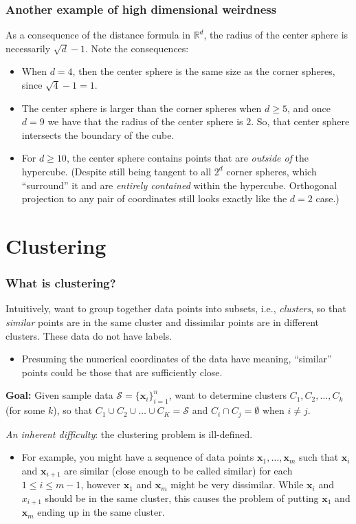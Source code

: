 \documentclass[smaller]{beamer}
\theoremstyle{example}
\newcommand{\x}{\textbf{x}}
\begin{document}
\begin{frame}
    \frametitle{Another example of high dimensional weirdness}
    As a consequence of the distance formula in $\mathbb R^d$, the radius of the center sphere is necessarily $\sqrt{d} - 1$. Note the consequences: 
    \begin{itemize}
        \item When $d=4$, then the center sphere is the same size as the corner spheres, since $\sqrt{4}-1 = 1$.
        \item The center sphere is larger than the corner spheres when $d\ge 5$, and once $d = 9$ we have that the radius of the center sphere is $2$. So, that center sphere intersects the boundary of the cube.
        \item For $d\ge 10$, the center sphere contains points that are \textit{outside of} the hypercube. (Despite still being tangent to all $2^d$ corner spheres, which ``surround'' it and are \textit{entirely contained} within the hypercube. Orthogonal projection to any pair of coordinates still looks exactly like the $d=2$ case.)
    \end{itemize}
\end{frame}

\section{Clustering}

\begin{frame}
    \frametitle{What is clustering?}
    Intuitively, want to group together data points into subsets, i.e., \textit{clusters}, so that \textit{similar} points are in the same cluster and dissimilar points are in different clusters. These data do not have labels. 
    
    \begin{itemize}
        \item Presuming the numerical coordinates of the data have meaning, ``similar'' points could be those that are sufficiently close.
    \end{itemize}
    
    \textbf{Goal:} Given sample data $\mathcal S=\{\x_i\}_{i=1}^n$, want to determine clusters $C_1,C_2,\ldots,C_k$ (for some $k$), so that $C_1\cup C_2\cup \ldots\cup C_K= \mathcal S$ and $C_i\cap C_j = \emptyset$ when $i\ne j$.
    \vfill 

    \textit{An inherent difficulty}: the clustering problem is ill-defined. 
    \begin{itemize}
        \item For example, you might have a sequence of data points $\x_1,\ldots,\x_m$ such that $\x_i$ and $\x_{i+1}$ are similar (close enough to be called similar) for each $1\le i\le m-1$, however $\x_1$ and $\x_m$ might be very dissimilar. While $\x_i$ and $x_{i+1}$ should be in the same cluster, this causes the problem of putting $\x_1$ and $\x_m$ ending up in the same cluster.
    \end{itemize}
\end{frame}
\end{document}
